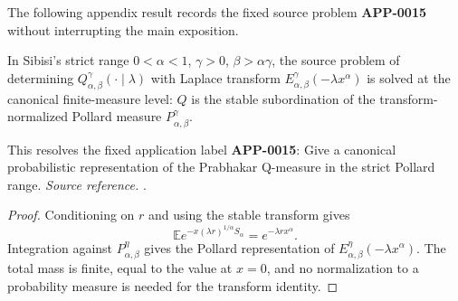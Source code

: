 The following appendix result records the fixed source problem \textbf{APP-0015} without interrupting the main exposition.
\begin{corollary}
\label{res:sibisi-prabhakar-q-measure-problem-solved-canonical}
In Sibisi's strict range \(0<\alpha<1\), \(\gamma>0\), \(\beta>\alpha\gamma\), the source problem of determining \(Q^\gamma_{\alpha,\beta}(\cdot\mid\lambda)\) with Laplace transform \(E^\gamma_{\alpha,\beta}(-\lambda x^\alpha)\) is solved at the canonical finite-measure level: \(Q\) is the stable subordination of the transform-normalized Pollard measure \(P^\gamma_{\alpha,\beta}\).

This resolves the fixed application label \textbf{APP-0015}: Give a canonical probabilistic representation of the Prabhakar Q-measure in the strict Pollard range.
\emph{Source reference.} \cite{app-app-0015-source}.
\end{corollary}
\begin{proof}
Conditioning on \(r\) and using the stable transform gives
\[
 \mathbb E e^{-x(\lambda r)^{1/\alpha}S_\alpha}=e^{-\lambda r x^\alpha}.
\]
Integration against \(P_{\alpha,\beta}^{\eta}\) gives the Pollard
representation of \(E_{\alpha,\beta}^{\eta}(-\lambda x^\alpha)\).  The total
mass is finite, equal to the value at \(x=0\), and no normalization to a
probability measure is needed for the transform identity.
\end{proof}
